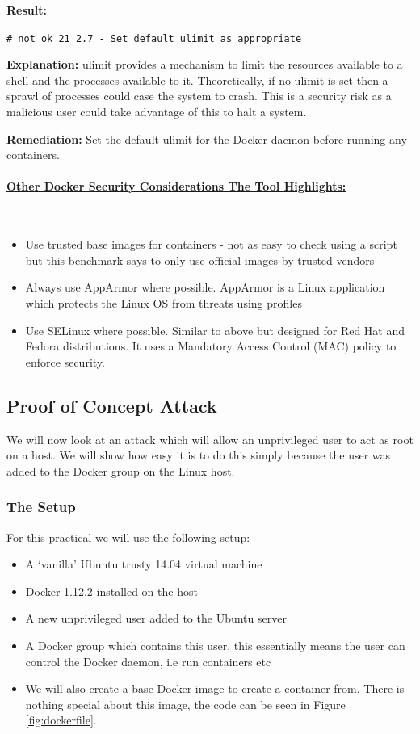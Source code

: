 \documentclass{article}
\begin{document}
\textbf{Result:} 

\texttt{\# not ok 21 2.7 - Set default ulimit as appropriate}

\textbf{Explanation:} ulimit provides a mechanism to limit the resources available to a shell and the processes available to it. Theoretically, if no ulimit is set then a sprawl of processes could case the system to crash. This is a security risk as a malicious user could take advantage of this to halt a system.

\textbf{Remediation:} Set the default ulimit for the Docker daemon before running any containers.

\paragraph{\underline{Other Docker Security Considerations The Tool Highlights:}}\mbox{}\\

\begin{itemize}
  \item Use trusted base images for containers - not as easy to check using a script but this benchmark says to only use official images by trusted vendors
  \item Always use AppArmor where possible. AppArmor is a Linux application which protects the Linux OS from threats using profiles
  \item Use SELinux where possible. Similar to above but designed for Red Hat and Fedora distributions. It uses a Mandatory Access Control (MAC) policy to enforce security.
\end{itemize}

\subsection{Proof of Concept Attack}
\label{sub:attack}
We will now look at an attack which will allow an unprivileged user to act as root on a host. We will show how easy it is to do this simply because the user was added to the Docker group on the Linux host. 

\subsubsection{The Setup}
For this practical we will use the following setup:

\begin{itemize}
  \item A `vanilla' Ubuntu trusty 14.04 virtual machine
  \item Docker 1.12.2 installed on the host
  \item A new unprivileged user added to the Ubuntu server
  \item A Docker group which contains this user, this essentially means the user can control the Docker daemon, i.e run containers etc
  \item We will also create a base Docker image to create a container from. There is nothing special about this image, the code can be seen in Figure \ref{fig:dockerfile}.
\end{itemize}
\end{document}
